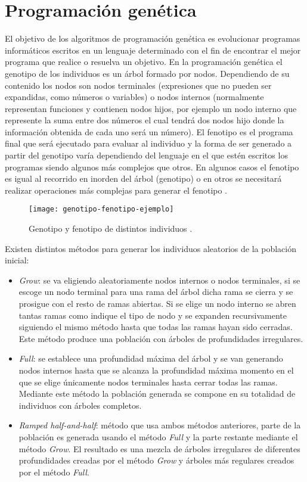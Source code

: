 \section{Programación genética}
El objetivo de los algoritmos de programación genética es evolucionar programas informáticos escritos en un lenguaje determinado con el fin de encontrar el mejor programa que realice o resuelva un objetivo. En la programación genética el genotipo de los individuos es un árbol formado por nodos. Dependiendo de su contenido los nodos son nodos terminales (expresiones que no pueden ser expandidas, como números o variables) o nodos internos (normalmente representan funciones y contienen nodos hijos, por ejemplo un nodo interno que represente la suma entre dos números el cual tendrá dos nodos hijo donde la información obtenida de cada uno será un número). El fenotipo es el programa final que será ejecutado para evaluar al individuo y la forma de ser generado a partir del genotipo varía dependiendo del lenguaje en el que estén escritos los programas siendo algunos más complejos que otros. En algunos casos el fenotipo es igual al recorrido en inorden del árbol (genotipo) o en otros se necesitará realizar operaciones más complejas para generar el fenotipo \cite{cervigon09}.
\begin{figure}[H]
\centering
\texttt{[image: genotipo-fenotipo-ejemplo]}
\caption{Genotipo y fenotipo de distintos individuos \cite{colmenarApuntes}.}
\end{figure}

Existen distintos métodos para generar los individuos aleatorios de la población inicial:
\begin{itemize}
\item \textit{Grow}: se va eligiendo aleatoriamente nodos internos o nodos terminales, si se escoge un nodo terminal para una rama del árbol dicha rama se cierra y se prosigue con el resto de ramas abiertas. Si se elige un nodo interno se abren tantas ramas como indique el tipo de nodo y se expanden recursivamente siguiendo el mismo método hasta que todas las ramas hayan sido cerradas. Este método produce una población con árboles de profundidades irregulares.

\item \textit{Full}: se establece una profundidad máxima del árbol y se van generando nodos internos hasta que se alcanza la profundidad máxima momento en el que se elige únicamente nodos terminales hasta cerrar todas las ramas. Mediante este método la población generada se compone en su totalidad de individuos con árboles completos.

\item \textit{Ramped half-and-half}: método que usa ambos métodos anteriores, parte de la población es generada usando el método \textit{Full} y la parte restante mediante el método \textit{Grow}. El resultado es una mezcla de árboles irregulares de diferentes profundidades creadas por el método \textit{Grow} y árboles más regulares creados por el método \textit{Full}.
\end{itemize}

